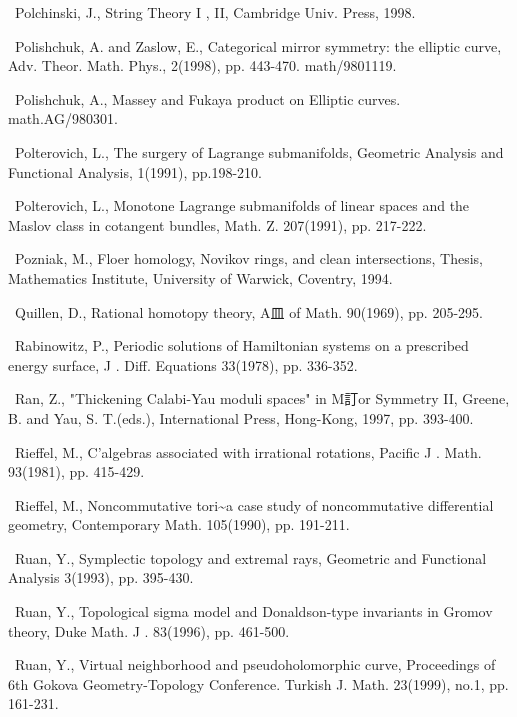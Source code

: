 {\noindent [304]\ Polchinski, J., String Theory I , II, Cambridge Univ. Press, 1998.\par\smallskip
\noindent [305]\ Polishchuk, A. and Zaslow, E., Categorical mirror symmetry: the elliptic curve, Adv. Theor. Math. Phys., 2(1998), pp. 443-470. math/9801119.\par\smallskip
\noindent [306]\ Polishchuk, A., Massey and Fukaya product on Elliptic curves. math.AG/980301.\par\smallskip
\noindent [307]\ Polterovich, L., The surgery of Lagrange submanifolds, Geometric Analysis and Functional Analysis, 1(1991), pp.198-210.\par\smallskip
\noindent [308]\ Polterovich, L., Monotone Lagrange submanifolds of linear spaces and the Maslov class in cotangent bundles, Math. Z. 207(1991), pp. 217-222.\par\smallskip
\noindent [309]\ Pozniak, M., Floer homology, Novikov rings, and clean intersections, Thesis, Mathematics Institute, University of Warwick, Coventry, 1994.\par\smallskip
\noindent [310]\ Quillen, D., Rational homotopy theory, A皿 of Math. 90(1969), pp. 205-295.\par\smallskip
\noindent [311]\ Rabinowitz, P., Periodic solutions of Hamiltonian systems on a prescribed energy surface, J . Diff. Equations 33(1978), pp. 336-352.\par\smallskip
\noindent [312]\ Ran, Z., "Thickening Calabi-Yau moduli spaces" in M訂or Symmetry II, Greene, B. and Yau, S. T.(eds.), International Press, Hong-Kong, 1997, pp. 393-400.\par\smallskip
\noindent [313]\ Rieffel, M., C'algebras associated with irrational rotations, Pacific J . Math. 93(1981), pp. 415-429.\par\smallskip
\noindent [314]\ Rieffel, M., Noncommutative tori\textasciitilde{}a case study of noncommutative differential geometry, Contemporary Math. 105(1990), pp. 191-211.\par\smallskip
\noindent [315]\ Ruan, Y., Symplectic topology and extremal rays, Geometric and Functional Analysis 3(1993), pp. 395-430.\par\smallskip
\noindent [316]\ Ruan, Y., Topological sigma model and Donaldson-type invariants in Gromov theory, Duke Math. J . 83(1996), pp. 461-500.\par\smallskip
\noindent [317]\ Ruan, Y., Virtual neighborhood and pseudoholomorphic curve, Proceedings of 6th Gokova Geometry-Topology Conference. Turkish J. Math. 23(1999), no.1, pp. 161-231.\par\smallskip
}
